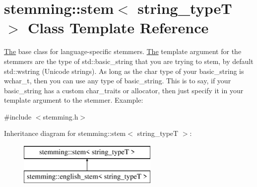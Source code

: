 \hypertarget{classstemming_1_1stem}{\section{stemming\-:\-:stem$<$ string\-\_\-type\-T $>$ Class Template Reference}
\label{classstemming_1_1stem}
}


\hyperlink{class_the}{The} base class for language-\/specific stemmers. \hyperlink{class_the}{The} template argument for the stemmers are the type of std\-::basic\-\_\-string that you are trying to stem, by default std\-::wstring (Unicode strings). As long as the char type of your basic\-\_\-string is wchar\-\_\-t, then you can use any type of basic\-\_\-string. This is to say, if your basic\-\_\-string has a custom char\-\_\-traits or allocator, then just specify it in your template argument to the stemmer. Example\-:  




{\ttfamily \#include $<$stemming.\-h$>$}

Inheritance diagram for stemming\-:\-:stem$<$ string\-\_\-type\-T $>$\-:\begin{figure}[H]
\begin{center}
\leavevmode
\includegraphics[height=2.000000cm]{classstemming_1_1stem}
\end{center}
\end{figure}
